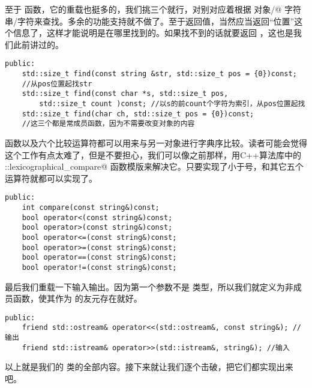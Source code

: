 至于 \lstinline@find@ 函数，它的重载也挺多的，我们挑三个就行，对别对应着根据 \lstinline@string@ 对象/\lstinline@char[N]@ 字符串/字符来查找。多余的功能支持就不做了。至于返回值，当然应当返回``位置''这个信息了，这样才能说明是在哪里找到的。如果找不到的话就要返回 \lstinline@npos@，这也是我们此前讲过的。
\begin{lstlisting}
public:
    std::size_t find(const string &str, std::size_t pos = {0})const;
    //从pos位置起找str
    std::size_t find(const char *s, std::size_t pos,
        std::size_t count )const; //以s的前count个字符为索引，从pos位置起找
    std::size_t find(char ch, std::size_t pos = {0})const;
    //这三个都是常成员函数，因为不需要改变对象的内容
\end{lstlisting}\par
\lstinline@compare@ 函数以及六个比较运算符都可以用来与另一对象进行字典序比较。读者可能会觉得这个工作有点太难了，但是不要担心，我们可以像之前那样，用C++算法库中的 \lstinline@std::lexicographical_compare@ 函数模版来解决它。只要实现了小于号，\lstinline@compare@ 和其它五个运算符就都可以实现了。
\begin{lstlisting}
public:
    int compare(const string&)const;
    bool operator<(const string&)const;
    bool operator>(const string&)const;
    bool operator<=(const string&)const;
    bool operator>=(const string&)const;
    bool operator==(const string&)const;
    bool operator!=(const string&)const;
\end{lstlisting}\par
最后我们重载一下输入输出。因为第一个参数不是 \lstinline@string@ 类型，所以我们就定义为非成员函数，使其作为 \lstinline@string@ 的友元存在就好。
\begin{lstlisting}
public:
    friend std::ostream& operator<<(std::ostream&, const string&); //输出
    friend std::istream& operator>>(std::istream&, string&); //输入
\end{lstlisting}\par
以上就是我们的 \lstinline@string@ 类的全部内容。接下来就让我们逐个击破，把它们都实现出来吧。\par

